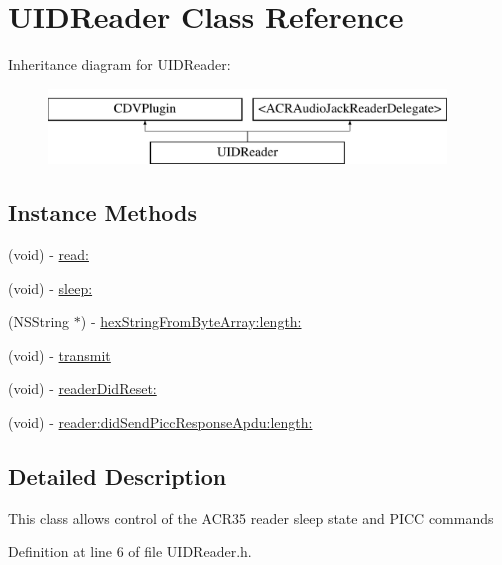 \hypertarget{interfaceUIDReader}{}\section{U\+I\+D\+Reader Class Reference}
\label{interfaceUIDReader}
Inheritance diagram for U\+I\+D\+Reader\+:\begin{figure}[H]
\begin{center}
\leavevmode
\includegraphics[height=2.000000cm]{interfaceUIDReader}
\end{center}
\end{figure}
\subsection*{Instance Methods}
\begin{DoxyCompactItemize}
\item 
(void) -\/ \hyperlink{interfaceUIDReader_af0ef56b58bad390f3f85481869b3138d}{read\+:}
\item 
(void) -\/ \hyperlink{interfaceUIDReader_a37ffaeb0dc8c3c98219e1dbdb8d2f102}{sleep\+:}
\item 
(N\+S\+String $\ast$) -\/ \hyperlink{interfaceUIDReader_abd2d0ead6a01740f10a8bfea53ff08af}{hex\+String\+From\+Byte\+Array\+:length\+:}
\item 
(void) -\/ \hyperlink{interfaceUIDReader_a26686ee664bbaa266254cb777604bfc8}{transmit}
\item 
(void) -\/ \hyperlink{interfaceUIDReader_a93db7b28395eea0b5350a8baf5891d70}{reader\+Did\+Reset\+:}
\item 
(void) -\/ \hyperlink{interfaceUIDReader_a6c76d217a0d26bc946c8e4b00092e526}{reader\+:did\+Send\+Picc\+Response\+Apdu\+:length\+:}
\end{DoxyCompactItemize}


\subsection{Detailed Description}
This class allows control of the A\+C\+R35 reader sleep state and P\+I\+C\+C commands 

Definition at line 6 of file U\+I\+D\+Reader.\+h.



